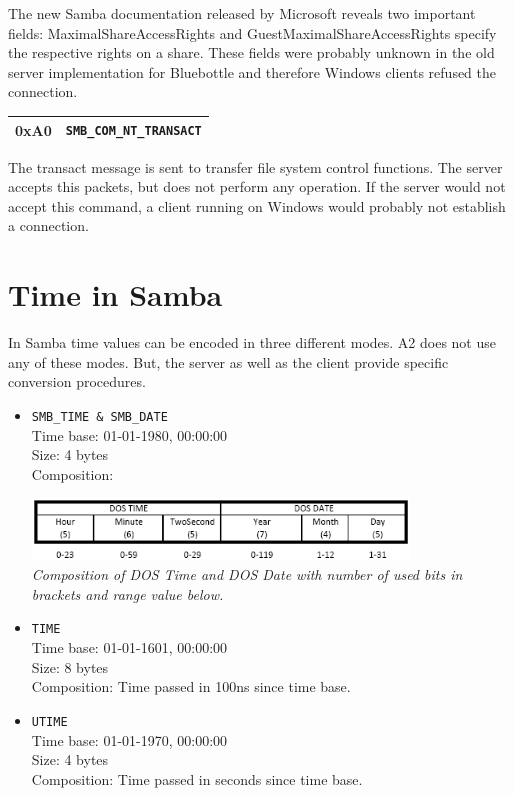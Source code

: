 \documentclass[11pt,a4paper]{book}
\begin{document}
The new Samba documentation released by Microsoft reveals two important fields: MaximalShareAccessRights and GuestMaximalShareAccessRights specify the respective rights on a share. These fields were probably unknown in the old server implementation for Bluebottle and therefore Windows clients refused the connection.

\begin{center}
\renewcommand{\tabcolsep}{5mm}
\begin{tabular}{p{3cm}p{8cm}}
0xA0 & \texttt{SMB\_COM\_NT\_TRANSACT} \\
\hline
\end{tabular}
\end{center}
The transact message is sent to transfer file system control functions. The server accepts this packets, but does not perform any operation. If the server would not accept this command, a client running on Windows would probably not establish a connection.

\section{Time in Samba}
In Samba time values can be encoded in three different modes. A2 does not use any of these modes. But, the server as well as the client provide specific conversion procedures.
\begin{itemize}
\item \texttt{SMB\_TIME \& SMB\_DATE} \\ Time base: 01-01-1980, 00:00:00 \\ Size: 4 bytes \\ Composition:
\begin{center}
\includegraphics[width=10cm]{dostime.png} \\
\vspace{6pt}
\textit{Composition of DOS Time and DOS Date with number of used bits in brackets and range value below.}
\end{center}

\item \texttt{TIME} \\ Time base: 01-01-1601, 00:00:00 \\ Size: 8 bytes \\ Composition: Time passed in 100ns since time base.

\item \texttt{UTIME} \\ Time base: 01-01-1970, 00:00:00 \\ Size: 4 bytes \\ Composition: Time passed in seconds since time base.
\end{itemize}
\end{document}

